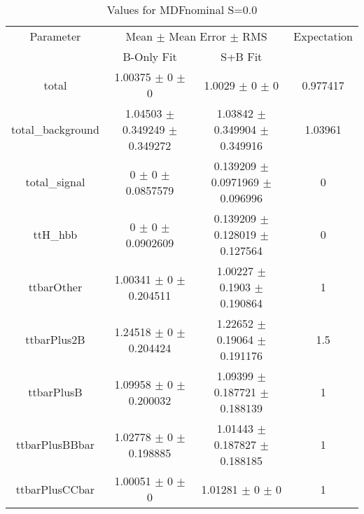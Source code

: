 \begin{table}
\centering
\caption{Values for MDFnominal S=0.0}
\begin{tabular}{cccc}
\toprule
Parameter & \multicolumn{2}{c}{Mean $\pm$ Mean Error $\pm$ RMS} & Expectation\\
 & B-Only Fit & S+B Fit & \\
\midrule
total & \num{1.00375} $\pm$ \num{0} $\pm$ \num{0} & \num{1.0029} $\pm$ \num{0} $\pm$ \num{0} & \num{0.977417}\\
total\_background & \num{1.04503} $\pm$ \num{0.349249} $\pm$ \num{0.349272} & \num{1.03842} $\pm$ \num{0.349904} $\pm$ \num{0.349916} & \num{1.03961}\\
total\_signal & \num{0} $\pm$ \num{0} $\pm$ \num{0.0857579} & \num{0.139209} $\pm$ \num{0.0971969} $\pm$ \num{0.096996} & \num{0}\\
ttH\_hbb & \num{0} $\pm$ \num{0} $\pm$ \num{0.0902609} & \num{0.139209} $\pm$ \num{0.128019} $\pm$ \num{0.127564} & \num{0}\\
ttbarOther & \num{1.00341} $\pm$ \num{0} $\pm$ \num{0.204511} & \num{1.00227} $\pm$ \num{0.1903} $\pm$ \num{0.190864} & \num{1}\\
ttbarPlus2B & \num{1.24518} $\pm$ \num{0} $\pm$ \num{0.204424} & \num{1.22652} $\pm$ \num{0.19064} $\pm$ \num{0.191176} & \num{1.5}\\
ttbarPlusB & \num{1.09958} $\pm$ \num{0} $\pm$ \num{0.200032} & \num{1.09399} $\pm$ \num{0.187721} $\pm$ \num{0.188139} & \num{1}\\
ttbarPlusBBbar & \num{1.02778} $\pm$ \num{0} $\pm$ \num{0.198885} & \num{1.01443} $\pm$ \num{0.187827} $\pm$ \num{0.188185} & \num{1}\\
ttbarPlusCCbar & \num{1.00051} $\pm$ \num{0} $\pm$ \num{0} & \num{1.01281} $\pm$ \num{0} $\pm$ \num{0} & \num{1}\\
\bottomrule
\end{tabular}
\end{table}